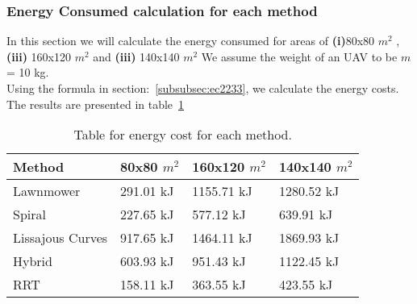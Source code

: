 \subsubsection{Energy Consumed calculation for each method}
In this section we will calculate the energy consumed for areas of \textbf{(i)}80x80 $m^{2}$ , \textbf{(iii)} 160x120 $m^{2}$ and \textbf{(iii)} 140x140 $m^{2}$
We assume the weight of an UAV to be $m$ = 10 kg.\\

Using the formula in section:~\ref{subsubsec:ec2233}, we calculate the energy costs. The results are presented in table~\ref{tab:ytyy33}

\begin{table}[htbp]
\centering
\caption{Table for energy cost for each method.}
\label{tab:ytyy33}
\begin{tabular}{|l|l|l|l|}
																	   \\ \hline
Method           & 80x80 $m^{2}$ & 160x120 $m^{2}$ & 140x140 $m^{2}$	    \\ \hline
Lawnmower        & 291.01 kJ     & 1155.71 kJ             & 1280.52 kJ    \\ \hline
Spiral           & 227.65 kJ     & 577.12 kJ              & 639.91 kJ      \\ \hline
Lissajous Curves & 917.65 kJ     & 1464.11 kJ             & 1869.93 kJ      \\ \hline
Hybrid           & 603.93 kJ     & 951.43 kJ              & 1122.45 kJ       \\ \hline
RRT              & 158.11 kJ     & 363.55 kJ              & 423.55 kJ         \\ \hline
\end{tabular}
\end{table}

